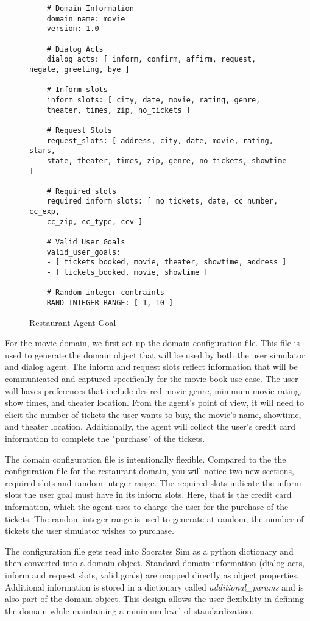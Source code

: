  \begin{figure}[h!]
	\caption{ Restaurant Agent Goal }
	\label{fig:ex_res_agent_goal}
	\begin{lstlisting}
	# Domain Information
	domain_name: movie
	version: 1.0
	
	# Dialog Acts
	dialog_acts: [ inform, confirm, affirm, request, negate, greeting, bye ]
	
	# Inform slots
	inform_slots: [ city, date, movie, rating, genre, 
	theater, times, zip, no_tickets ]
	
	# Request Slots
	request_slots: [ address, city, date, movie, rating, stars,
	state, theater, times, zip, genre, no_tickets, showtime ]
	
	# Required slots
	required_inform_slots: [ no_tickets, date, cc_number, cc_exp,
	cc_zip, cc_type, ccv ]
	
	# Valid User Goals
	valid_user_goals:
	- [ tickets_booked, movie, theater, showtime, address ]
	- [ tickets_booked, movie, showtime ]
	
	# Random integer contraints
	RAND_INTEGER_RANGE: [ 1, 10 ]
	\end{lstlisting}
\end{figure}

For the movie domain, we first set up the domain configuration file. This file is used to generate the domain object that will be used by both the user simulator and dialog agent. The inform and request slots reflect information that will be communicated and captured specifically for the movie book use case. The user will haves preferences that include desired movie genre, minimum movie rating, show times, and theater location. From the agent's point of view, it will need to elicit the number of tickets the user wants to buy, the movie's name, showtime, and theater location. Additionally, the agent will collect the user's credit card information to complete the "purchase" of the tickets. 

The  domain configuration file is intentionally flexible. Compared to the the configuration file for the restaurant domain, you will notice two new sections, required slots and random integer range. The required slots indicate the inform slots the user goal must have in its inform slots. Here, that is the credit card information, which the agent uses to charge the user for the purchase of the tickets. The random integer range is used to generate at random, the number of tickets the user simulator wishes to purchase. 

The configuration file gets read into Socrates Sim as a python dictionary and then converted into a domain object. Standard domain information (dialog acts, inform and request slots, valid goals) are mapped directly as object properties. Additional information is stored in a dictionary called \textit{additional\_params} and is also part of the domain object. This design allows the user flexibility in defining the domain while maintaining a minimum level of standardization. 

